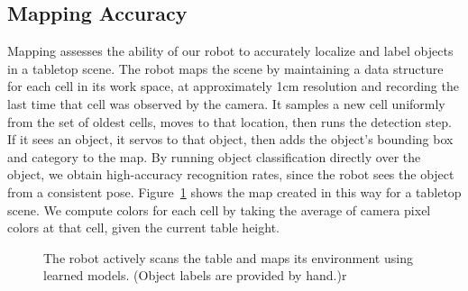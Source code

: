 \documentclass[graybox]{svmult}
\begin{document}
\subsection{Mapping Accuracy}

Mapping assesses the ability of our robot to accurately localize and
label objects in a tabletop scene.  The robot maps the scene by
maintaining a data structure for each cell in its work space, at
approximately 1cm resolution and recording the last time that cell was
observed by the camera.  It samples a new cell uniformly from the set
of oldest cells, moves to that location, then runs the detection step.
If it sees an object, it servos to that object, then adds the object's
bounding box and category to the map.  By running object
classification directly over the object, we obtain high-accuracy
recognition rates, since the robot sees the object from a consistent
pose. Figure~\ref{fig:map} shows the map created in this way for a
tabletop scene.  We compute colors for each cell by taking the average
of camera pixel colors at that cell, given the current table height.


\begin{figure}
\caption{The robot actively scans the table and maps its environment
  using learned models.  (Object labels are provided by hand.)\label{fig:map}r}
\end{figure}
\end{document}
